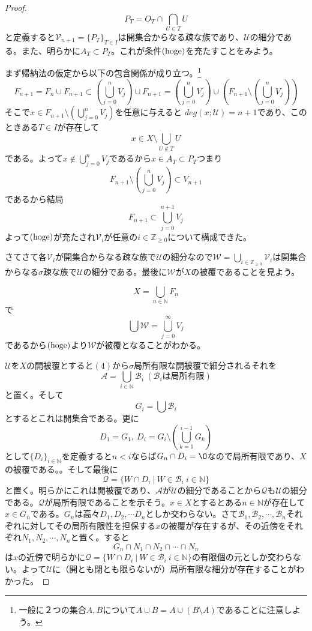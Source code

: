 \documentclass[leqno]{jsarticle}
\newcommand{\To}{\Longrightarrow}
\newcommand{\nn}{\mathbb{N}}
\newcommand{\zz}{\mathbb{Z}}
\newcommand{\mgn}{\infty}
\newcommand{\dpst}{\displaystyle}
\begin{document}
\begin{proof}
\[
P_T=O_T\cap \bigcap_{U\in T}U
\]
と定義すると$\mathcal{V}_{n+1}=\{P_T\}_{T\in I}$は開集合からなる疎な族であり、$\mathcal{U}$の細分である。また、明らかに$A_T\subset P_{T}$。これが条件$({\rm hoge})$を充たすことをみよう。\par 
まず帰納法の仮定から以下の包含関係が成り立つ。\footnote{一般に２つの集合$A,B$について$A\cup B=A\cup(B\setminus A)$であることに注意しよう。}
\[
F_{n+1}=F_n\cup F_{n+1}\subset \left(\bigcup_{j=0}^{n}V_j\right)\cup F_{n+1}= \left(\bigcup_{j=0}^{n}V_j\right)\cup \left(F_{n+1}\setminus \left(\bigcup_{j=0}^{n}V_j\right)\right)
\]
そこで$x\in F_{n+1}\setminus \left(\bigcup_{j=0}^{n}V_j\right)$を任意に与えると
$deg(x;\mathcal{U})=n+1$であり、このときある$T\in I$が存在して
\[
x\in X\setminus \bigcup_{U\not\in T}U
\]
である。よって$x\not\in \bigcup_{j=0}^nV_j $であるから$x\in A_{T}\subset P_{T}$つまり
\[
F_{n+1}\setminus \left(\bigcup_{j=0}^{n}V_j\right)\subset V_{n+1}
\]
であるから結局
\[
F_{n+1}\subset \bigcup_{j=0}^{n+1}V_j
\]
よって$({\rm hoge})$が充たされ$\mathcal{V}_i$が任意の$i\in \zz_{\ge 0}$について構成できた。\par
さてさて各$\mathcal{V}_i$が開集合からなる疎な族で$\mathcal{U}$の細分なので$\dpst \mathcal{W}=\bigcup_{i\in\zz_{\ge 0}}\mathcal{V}_i$は開集合からなる$\sigma$疎な族で$\mathcal{U}$の細分である。最後に$\mathcal{W}$が$X$の被覆であることを見よう。\par
\[
X=\bigcup_{n\in \nn}F_n
\]
で
\[
\bigcup\mathcal{W}=\bigcup_{j=0}^{\mgn}V_{j}
\]
であるから$({\rm hoge})$より$\mathcal{W}$が被覆となることがわかる。
\par[$(6)\To (5)$の証明終わり]\par
[$(4)\To (3)$の証明]\par
$\mathcal{U}$を$X$の開被覆とすると$(4)$から$\sigma$局所有限な開被覆で細分されるそれを
\[
\mathcal{A}=\bigcup_{i\in \nn}\mathcal{B}_i\ (\mbox{$\mathcal{B}_i$は局所有限})
\]
と置く。そして
\[
G_i=\bigcup\mathcal{B}_i
\]
とするとこれは開集合である。更に
\[
D_1=G_1,\ D_i=G_i\setminus \left(\bigcup_{k=1}^{i-1} G_k\right)
\]
として$\{D_{i}\}_{i\in \nn}$を定義すると$n<i$ならば$G_n\cap D_i=\O$なので局所有限であり、$X$の被覆である。。そして最後に
\[
\mathcal{Q}=\{W\cap D_i\ |\ W\in \mathcal{B}_i\ i\in \nn\}
\]
と置く。明らかにこれは開被覆であり、$\mathcal{A}$が$\mathcal{U}$の細分であることから$\mathcal{Q}$も$\mathcal{U}$の細分である。$\mathcal{Q}$が局所有限であることを示そう。$x\in X$とするとある$n\in \nn$が存在して$x\in G_n$である。$G_n$は高々$D_1,D_2,\cdots D_n$としか交わらない。さて$\mathcal{B}_1,\mathcal{B}_2,\cdots,\mathcal{B}_n $それぞれに対してその局所有限性を担保する$x$の被覆が存在するが、その近傍をそれぞれ$N_1,N_2,\cdots ,N_n$と置く。すると
\[
G_n\cap N_1\cap N_2\cap \cdots \cap N_n
\]
は$x$の近傍で明らかに$\mathcal{Q}=\{W\cap D_i\ |\ W\in \mathcal{B}_i\ i\in \nn\}$の有限個の元としか交わらない。よって$\mathcal{U}$に（開とも閉とも限らないが）局所有限な細分が存在することがわかった。
\par[$(4)\To (3)$の証明終わり]

\end{proof}
\end{document}
